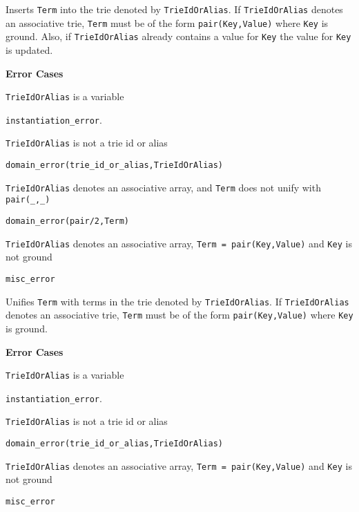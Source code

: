 \begin{description}
%
Inserts {\tt Term} into the trie denoted by {\tt TrieIdOrAlias}.  If
{\tt TrieIdOrAlias} denotes an associative trie, {\tt Term} must be of
the form {\tt pair(Key,Value)} where {\tt Key} is ground.  Also, if
{\tt TrieIdOrAlias} already contains a value for {\tt Key} the value
for {\tt Key} is updated.

{\bf Error Cases}
\bi
\item 	{\tt TrieIdOrAlias} is a variable
\bi
\item 	{\tt instantiation\_error}.
\ei
\item 	{\tt TrieIdOrAlias} is not a trie id or alias
\bi
\item 	{\tt domain\_error(trie\_id\_or\_alias,TrieIdOrAlias)}
\ei
\item 	{\tt TrieIdOrAlias} denotes an associative array, and {\tt Term} 
  does not unify with {\tt pair(\_,\_)} 
\bi
\item 	{\tt domain\_error(pair/2,Term)}
\ei
\item 	{\tt TrieIdOrAlias} denotes an associative array, 
  {\tt Term = pair(Key,Value)} and {\tt Key} is not ground 
\bi
\item 	{\tt misc\_error}
\ei
\ei
%

Unifies {\tt Term} with terms in the trie denoted by {\tt TrieIdOrAlias}.  If
{\tt TrieIdOrAlias} denotes an associative trie, {\tt Term} must be of
the form {\tt pair(Key,Value)} where {\tt Key} is ground.  

{\bf Error Cases}
\bi
\item 	{\tt TrieIdOrAlias} is a variable
\bi
\item 	{\tt instantiation\_error}.
\ei
\item 	{\tt TrieIdOrAlias} is not a trie id or alias
\bi
\item 	{\tt domain\_error(trie\_id\_or\_alias,TrieIdOrAlias)}
\ei
\item {\tt TrieIdOrAlias} denotes an associative array, 
  {\tt Term = pair(Key,Value)} and {\tt Key} is not ground 
\bi
\item 	{\tt misc\_error}
\ei
\ei


\end{description}
